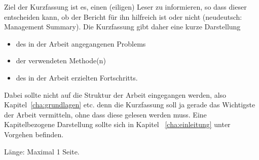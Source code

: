   Ziel der Kurzfassung ist es, einen (eiligen) Leser zu informieren, so 
  dass dieser entscheiden kann, ob der Bericht für ihn hilfreich ist oder 
  nicht (neudeutsch: Management Summary). Die Kurzfassung gibt daher eine 
  kurze Darstellung

  \begin{itemize}
    \item des in der Arbeit angegangenen Problems
    \item der verwendeten Methode(n)
    \item des in der Arbeit erzielten Fortschritts.
  \end{itemize}

  Dabei sollte nicht auf die Struktur der Arbeit eingegangen werden, also 
  Kapitel~\ref{cha:grundlagen} etc. denn die Kurzfassung soll ja gerade 
  das Wichtigste der Arbeit vermitteln, ohne dass diese gelesen werden muss.
  Eine Kapitelbezogene Darstellung sollte sich in Kapitel~%
  \ref{cha:einleitung} unter Vorgehen befinden.

  Länge: Maximal 1 Seite.